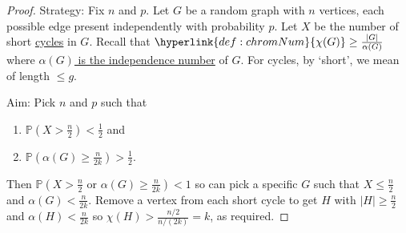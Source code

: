 \documentclass{article}
\begin{document}
\begin{proof}
    Strategy: Fix $n$ and $p$. Let $G$ be a random graph with $n$ vertices, each possible edge present independently with probability $p$.
    Let $X$ be the number of short \hyperlink{def:cycle}{cycles} in $G$.
    Recall that $\hyperlink{def:chromNum}{\chi(G)} \geq \frac{|G|}{\alpha(G)}$ where \hyperlink{def:indepNum}{$\alpha(G)$ is the independence number} of $G$.
    For cycles, by `short', we mean of length $\leq g$.

    Aim: Pick $n$ and $p$ such that
    \begin{enumerate}
        \item $\mathbb{P}(X > \frac{n}{2}) < \frac{1}{2}$ and
        \item $\mathbb{P}(\alpha(G) \geq \frac{n}{2k}) > \frac{1}{2}$.
    \end{enumerate}
    Then $\mathbb{P}(X > \frac{n}{2} \text{ or } \alpha(G) \geq \frac{n}{2k}) < 1$ so can pick a specific $G$ such that $X \leq \frac{n}{2}$ and $\alpha(G) < \frac{n}{2k}$.
    Remove a vertex from each short cycle to get $H$ with $|H| \geq \frac{n}{2}$ and $\alpha(H) < \frac{n}{2k}$ so $\chi(H) > \frac{n/2}{n/(2k)} = k$, as required.


\end{proof}
\end{document}
